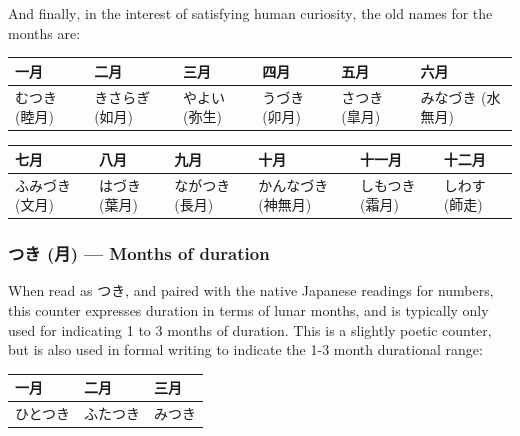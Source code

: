 \documentclass[11pt, b5paper, twoside, openright, onecolumn]{book}
\makeatletter
\newcommand*{\rtrubystack}[2]{{\relscale{0.5}%
  \begin{tabular}[b]{@{}c@{}}%
    {#1}\\%
    {\textscale{2}{#2}}%
  \end{tabular}}%
}
\DeclareRobustCommand*{\rtruby}[2]{%
  \mbox{%
    \setlength{\parskip}{0ex}%
    \BeginAccSupp{method=pdfstringdef,ActualText={#1}}%
      \rtrubystack{\phantom{#2}}{#1}%
      \llap{%
        \rtrubystack{#2}{\phantom{#1}}%
      }%
    \EndAccSupp{}%
  }%
}
\newcommand*{\rubystack}[2]{{\relscale{0.5}%
  \begin{tabular}[b]{@{}c@{}}%
    {#1}\\%
   {\textscale{2}{#2}}%
  \end{tabular}}%
}
\DeclareRobustCommand*{\ruby}[2]{%
  \mbox{%
    \setlength{\parskip}{0ex}%
    \BeginAccSupp{method=pdfstringdef,ActualText={#1}}%
      \rubystack{\phantom{#2}}{#1}%
      \llap{%
        \rubystack{#2}{\phantom{#1}}%
      }%
    \EndAccSupp{}%
  }%
}
\renewcommand*{\rtruby}[2]{#2 (#1)}%
\renewcommand*{\ruby}[2]{#2 (#1)}%
\newenvironment{mytabular}[1]{\noindent\hspace{0.4in}
\begin{tabular}[h]{#1}}{\end{tabular}}
\newenvironment{mytabularcentered}[1]{\noindent
\begin{center}\begin{tabular}[h]{#1}}{\end{tabular}\end{center}}
\makeatother
\begin{document}
And finally‚ in the interest of satisfying human curiosity‚ the old names for the months are:

\vspace{0.5cm}
\smaller
\begin{center}
\begin{mytabularcentered}{| l  l  l  l  l  l |}\hline 
\rule{0pt}{2.4ex}一月 & 二月 & 三月 & 四月 & 五月 & 六月\\ 
\hline
\rule{0pt}{3.6ex}\index[japanese]{むつき (睦月)}\rtruby{睦月}{むつき} & \index[japanese]{きさらぎ (如月)}\rtruby{如月}{きさらぎ} & \index[japanese]{やよい (弥生)}\rtruby{弥生}{やよい} & \index[japanese]{うづき (卯月)}\rtruby{卯月}{うづき} & \index[japanese]{さつき (皐月)}\rtruby{皐月}{さつき} & \index[japanese]{みなづき (水無月)}\rtruby{水無月}{みなづき}\\ 
\hline 
\end{mytabularcentered}
\end{center}
\larger
\vspace{0.5cm}

\smaller
\begin{center}
\begin{mytabularcentered}{| l  l  l  l  l  l |}\hline 
\rule{0pt}{2.4ex}七月 & 八月 & 九月 & 十月 & 十一月 & 十二月\\ 
\hline
\rule{0pt}{3.6ex}\index[japanese]{ふみづき (文月)}\rtruby{文月}{ふみづき} & \index[japanese]{はづき (葉月)}\rtruby{葉月}{はづき} & \index[japanese]{ながつき (長月)}\rtruby{長月}{ながつき} & \index[japanese]{かんなづき (神無月)}\rtruby{神無月}{かんなづき} & \index[japanese]{しもつき (霜月)}\rtruby{霜月}{しもつき} & \index[japanese]{しわす (師走)}\rtruby{師走}{しわす}\\ 
\hline 
\end{mytabularcentered}
\end{center}
\larger
\subsubsection{\ruby{月}{つき} — Months of duration}


When read as つき‚ and paired with the native Japanese readings for numbers‚ this counter expresses duration in terms of lunar months‚ and is typically only used for indicating 1 to 3 months of duration. This is a slightly poetic counter‚ but is also used in formal writing to indicate the 1-3 month durational range:

\vspace{0.5cm}
\smaller
\begin{mytabular}{| l  l  l |}\hline 
\rule{0pt}{2.4ex}一月 & 二月 & 三月\\ 
\hline
\rule{0pt}{2.4ex}ひとつき & ふたつき & みつき\\ 
\hline 
\end{mytabular}
\larger
\end{document}
